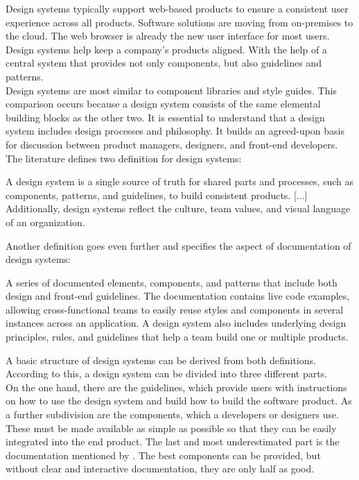 Design systems typically support web-based products to ensure a consistent user experience across all products. Software solutions are moving from on-premises to the cloud. The web browser is already the new user interface for most users. Design systems help keep a company's products aligned. With the help of a central system that provides not only components, but also guidelines and patterns.  \citep{macdonald_practical_2019} \\

Design systems are most similar to component libraries and style guides. This comparison occurs because a design system consists of the same elemental building blocks as the other two. It is essential to understand that a design system includes design processes and philosophy. It builds an agreed-upon basis for discussion between product managers, designers, and front-end developers. \cite{vesselov_building_2019} \\
The literature defines two definition for design systems:
\begin{tcolorbox}[title=Definition of design system by \citet*{macdonald_practical_2019}]
A design system is a single source of truth for shared parts and processes, such as components, patterns, and guidelines, to build consistent products. [...] Additionally, design systems reflect the culture, team values, and visual language of an organization.
\end{tcolorbox}
Another definition goes even further and specifies the aspect of documentation of design systems:
\begin{tcolorbox}[title=Definition of design system by \citet*{vesselov_building_2019}]
A series of documented elements, components, and patterns that include both design and front-end guidelines. The documentation contains live code examples, allowing cross-functional teams to easily reuse styles and components in several instances across an application. A design system also includes underlying design principles, rules, and guidelines that help a team build one or multiple products.
\end{tcolorbox}
A basic structure of design systems can be derived from both definitions. According to this, a design system can be divided into three different parts.\\

On the one hand, there are the guidelines, which provide users with instructions on how to use the design system and build how to build the software product. As a further subdivision are the components, which a developers or designers use. These must be made available as simple as possible so that they can be easily integrated into the end product. The last and most underestimated part is the documentation mentioned by \citet*{vesselov_building_2019}. The best components can be provided, but without clear and interactive documentation, they are only half as good. \\

